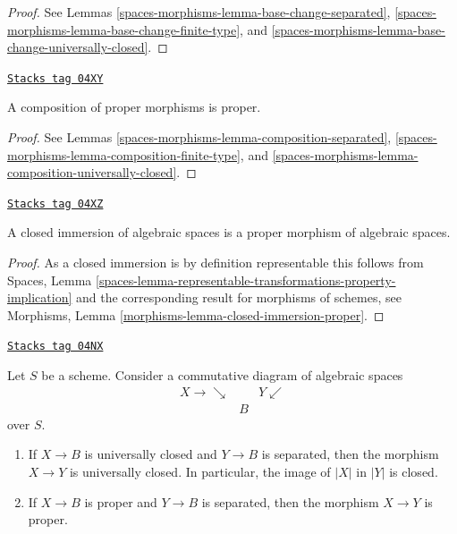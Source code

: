 \begin{proof}
See
Lemmas \ref{spaces-morphisms-lemma-base-change-separated},
\ref{spaces-morphisms-lemma-base-change-finite-type}, and
\ref{spaces-morphisms-lemma-base-change-universally-closed}.
\end{proof}

\begin{lemma}
\label{spaces-morphisms-lemma-composition-proper}
\href{https://stacks.math.columbia.edu/tag/04XY}{\texttt{Stacks tag 04XY}}

A composition of proper morphisms is proper.
\end{lemma}

\begin{proof}
See
Lemmas \ref{spaces-morphisms-lemma-composition-separated},
\ref{spaces-morphisms-lemma-composition-finite-type}, and
\ref{spaces-morphisms-lemma-composition-universally-closed}.
\end{proof}

\begin{lemma}
\label{spaces-morphisms-lemma-closed-immersion-proper}
\href{https://stacks.math.columbia.edu/tag/04XZ}{\texttt{Stacks tag 04XZ}}

A closed immersion of algebraic spaces is a proper morphism of
algebraic spaces.
\end{lemma}

\begin{proof}
As a closed immersion is by definition representable this follows from
Spaces,
Lemma \ref{spaces-lemma-representable-transformations-property-implication}
and the corresponding result for morphisms of schemes, see
Morphisms, Lemma \ref{morphisms-lemma-closed-immersion-proper}.
\end{proof}

\begin{lemma}
\label{spaces-morphisms-lemma-universally-closed-permanence}
\href{https://stacks.math.columbia.edu/tag/04NX}{\texttt{Stacks tag 04NX}}

Let $S$ be a scheme.
Consider a commutative diagram of algebraic spaces
$$
\begin{array}{ccc}X \longrightarrow\searrow &  & Y \swarrow \\  & B & \end{array}
$$
over $S$.
\begin{enumerate}
\item If $X \to B$ is universally closed and $Y \to B$ is
separated, then the morphism $X \to Y$ is universally closed.
In particular, the image of $|X|$ in $|Y|$ is closed.
\item If $X \to B$ is proper and $Y \to B$ is separated, then
the morphism $X \to Y$ is proper.
\end{enumerate}
\end{lemma}

